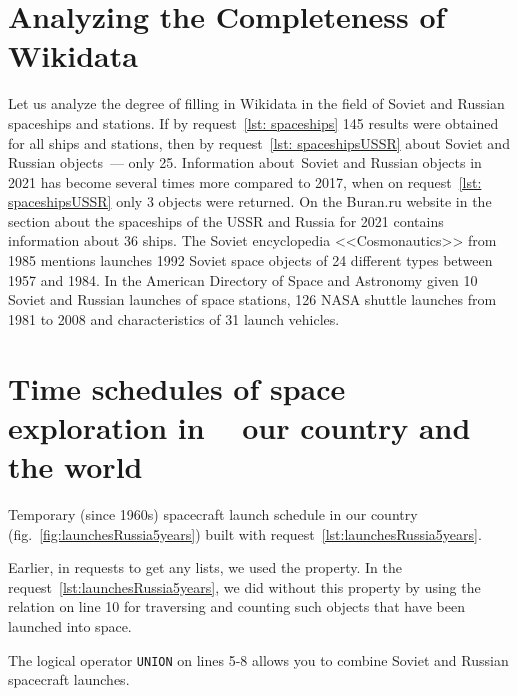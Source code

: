 \section{Analyzing the Completeness of Wikidata}

Let us analyze the degree of filling in Wikidata in the field of Soviet and Russian spaceships and stations.
If by request~\ref{lst: spaceships} 145 results were obtained for all ships and stations,
then by request~\ref{lst: spaceshipsUSSR} about Soviet and Russian objects~--- only 25.
Information about~Soviet and Russian objects in 2021
has become several times more compared to 2017,
when on request~\ref{lst: spaceshipsUSSR} only 3 objects were returned.
%
\label{question:spacecraft_1}
%
%
On the Buran.ru website in the section about the spaceships of the USSR and Russia for 2021
contains information about 36\autocite{spacecraftBuran} ships.
The Soviet encyclopedia <<Cosmonautics>> from 1985 mentions launches
1992 Soviet space objects of 24 different types
between 1957 and 1984.\autocite[498]{spacecraftCosmonavtika}
In the American Directory of Space and Astronomy
given 10 Soviet and Russian launches of space stations\autocite[296]{spacecraftSAA},
126 NASA shuttle launches from 1981 to 2008\autocite[288]{spacecraftSAA}
and characteristics of 31 launch vehicles\autocite[290-291]{spacecraftSAA}.

\section{Time schedules of space exploration in ~ our country and the world}

Temporary (since 1960s)
spacecraft launch schedule in our country (fig.~\ref{fig:launchesRussia5years})
built with request~\ref{lst:launchesRussia5years}.%

Earlier, in requests to get any lists, we used the property.
In the request~\ref{lst:launchesRussia5years}, we did without this property by using the relation
 on line 10
for traversing and counting such objects that have been launched into space.

The logical operator \lstinline|UNION| on lines 5-8
allows you to combine Soviet and Russian spacecraft launches.

